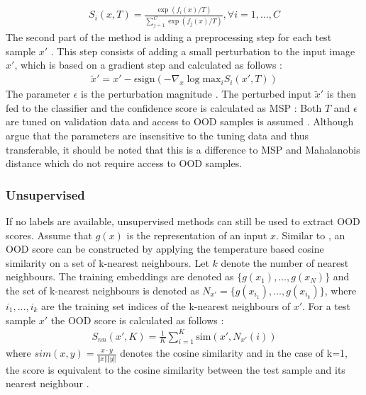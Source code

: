 \begin{align}
	S_i(x,T) = \frac{\exp(f_i(x)/T)}{\sum_{j=1}^{C}\exp(f_j(x)/T)}, \forall i=1,\dots,C
\end{align}
The second part of the method is adding a preprocessing step for each test sample $x'$ \citep{Liang2018}.
This step consists of adding a small perturbation to the input image $x'$, which is based on a gradient step and calculated as follows \citep{Liang2018}:
\begin{align}
	\tilde{x}' = x' - \epsilon \text{sign}(-\nabla_x \log \text{max}_i  S_i(x',T))
\end{align}
The parameter $\epsilon$ is the perturbation magnitude \citep{Liang2018}.
The perturbed input $\tilde{x}'$ is then fed to the classifier and the confidence score is calculated as MSP \citep{Liang2018}:
Both $T$ and $\epsilon$ are tuned on validation data and access to OOD samples is assumed \citep{Liang2018,Hsu2020}.
Although \citep{Liang2018} argue that the parameters are insensitive to the tuning data and thus transferable, it should be noted that this is a difference to MSP and Mahalanobis distance which do not require access to OOD samples.
\subsubsection*{Unsupervised}
If no labels are available, unsupervised methods can still be used to extract OOD scores.
Assume that $g(x)$ is the representation of an input $x$.
Similar to \citep{Michels2023,Sun2022}, an OOD score can be constructed by applying the temperature based cosine similarity on a set of k-nearest neighbours.
Let $k$ denote the number of nearest neighbours.
The training embeddings are denoted as $\{g(x_1),\dots,g(x_N)\}$ and the set of k-nearest neighbours is denoted as $N_{x'} = \{g(x_{i_1}),\dots,g(x_{i_k})\}$, where $i_1,\dots,i_k$ are the training set indices of the k-nearest neighbours of $x'$.
For a test sample $x'$ the OOD score is calculated as follows \citep{Michels2023,Sun2022}:
\begin{align}
	S_{nn}(x',K) = \frac{1}{K}\sum_{i=1}^K \text{sim}(x',N_{x'}(i))
\end{align}
where $sim(x,y) = \frac{x\cdot y}{\Vert x \Vert \Vert y \Vert}$ denotes the cosine similarity and in the case of k=1, the score is equivalent to the cosine similarity between the test sample and its nearest neighbour \citep{Michels2023}.
